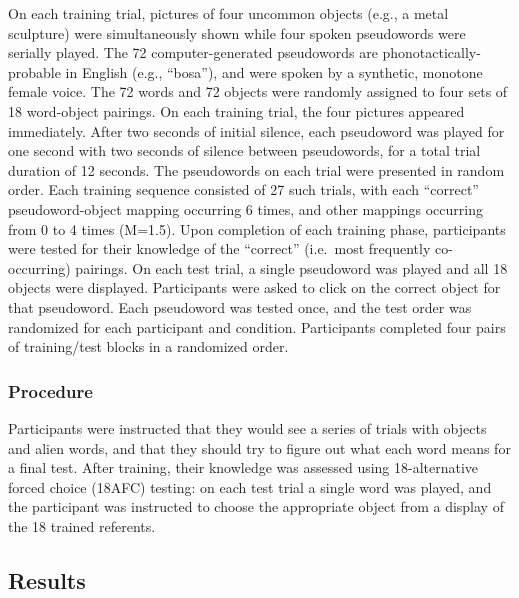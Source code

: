 \documentclass[man,floatsintext]{apa6}
\begin{document}
On each training trial, pictures of four uncommon objects (e.g., a metal sculpture) were simultaneously shown while four spoken pseudowords were serially played.
The 72 computer-generated pseudowords are phonotactically-probable in English (e.g., \enquote{bosa}), and were spoken by a synthetic, monotone female voice.
The 72 words and 72 objects were randomly assigned to four sets of 18 word-object pairings.
On each training trial, the four pictures appeared immediately. After two seconds of initial silence, each pseudoword was played for one second with two seconds of silence between pseudowords, for a total trial duration of 12 seconds.
The pseudowords on each trial were presented in random order.
Each training sequence consisted of 27 such trials, with each \enquote{correct} pseudoword-object mapping occurring 6 times, and other mappings occurring from 0 to 4 times (M=1.5).
Upon completion of each training phase, participants were tested for their knowledge of the \enquote{correct} (i.e.~most frequently co-occurring) pairings.
On each test trial, a single pseudoword was played and all 18 objects were displayed.
Participants were asked to click on the correct object for that pseudoword.
Each pseudoword was tested once, and the test order was randomized for each participant and condition.
Participants completed four pairs of training/test blocks in a randomized order.

\hypertarget{procedure}{%
\subsubsection{Procedure}\label{procedure}}

Participants were instructed that they would see a series of trials with objects and alien words, and that they should try to figure out what each word means for a final test.
After training, their knowledge was assessed using 18-alternative forced choice (18AFC) testing: on each test trial a single word was played, and the participant was instructed to choose the appropriate object from a display of the 18 trained referents.

\hypertarget{results}{%
\subsection{Results}\label{results}}
\end{document}
